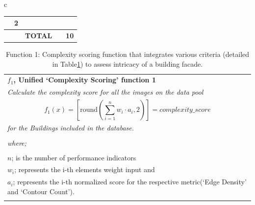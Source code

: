 \documentclass[final,5p,times]{elsarticle}%
\begin{document}
\begin{linenumbers}
\begin{table}[h!tb]
\begin{tabular}{c}
\begin{minipage}{\textwidth}
\begin{tabularx}{\textwidth}{p{3.5cm} p{1cm} X X p{1cm}}
                                &
                              2\\ \bottomrule
                               &
                               &
                              \textbf{TOTAL} &
                              &
                              \textbf{10}\\ \bottomrule
                        \end{tabularx}
                    \end{minipage}
                \end{tabular}
            \end{table}

            \begin{table}[htb]
                \caption{Function 1: Complexity scoring function that integrates various criteria (detailed in Table\ref{tab:ComplexityScoreFunction_table}) to assess intricacy of a building facade.}
                \label{tab:ComplexityScoreFunction_table}
                \centering
                \small
                \begin{tabular}{|p{8cm}|}
                \hline
                    \textbf{\(f_1\), Unified `Complexity Scoring' function 1}\\
                    \textit{Calculate the complexity score for all the images on the data pool}
                    \\
                    \begin{equation}
                        f_1(x) = \left[ \mathrm{round}\left(\sum_{i=1}^{n} w_i \cdot a_i, 2\right) \right] = complexity\_score
                    \label{eq:F1_ComplexityScoreFunction}
                    \end{equation}

                    \\
                    \textit{ for the Buildings included in the database.}\\
                    \\
                    \textit{where;} \\
                    \\
                    \(n \); is the number of performance indicators \\
                    \(w_i \); represents the i-th elements weight input and \\
                    \(a_i \); represents the i-th normalized score for the respective metric(`Edge Density' and `Contour Count').\\
                    \\


\end{tabular}
\end{table}
\end{linenumbers}
\end{document}
